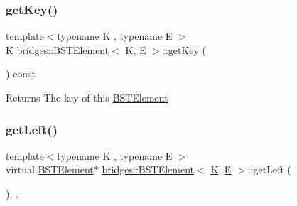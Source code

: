 \subsubsection{\texorpdfstring{getKey()}{getKey()}}
{\footnotesize\ttfamily template$<$typename K , typename E $>$ \\
\mbox{\hyperlink{namespacebridges_acfb0a4f7877d8f63de3e6862004c50edaa5f3c6a11b03839d46af9fb43c97c188}{K}} \mbox{\hyperlink{classbridges_1_1_b_s_t_element}{bridges\+::\+B\+S\+T\+Element}}$<$ \mbox{\hyperlink{namespacebridges_acfb0a4f7877d8f63de3e6862004c50edaa5f3c6a11b03839d46af9fb43c97c188}{K}}, \mbox{\hyperlink{namespacebridges_acfb0a4f7877d8f63de3e6862004c50eda3a3ea00cfc35332cedf6e5e9a32e94da}{E}} $>$\+::get\+Key (\begin{DoxyParamCaption}{ }\end{DoxyParamCaption}) const\hspace{0.3cm}{\ttfamily [inline]}}

\begin{DoxyReturn}{Returns}
The key of this \mbox{\hyperlink{classbridges_1_1_b_s_t_element}{B\+S\+T\+Element}} 
\end{DoxyReturn}
\mbox{\label{classbridges_1_1_b_s_t_element_a4d8987373c75b51fca94e3c0b78b87a6}} 
\subsubsection{\texorpdfstring{getLeft()}{getLeft()}\hspace{0.1cm}{\footnotesize\ttfamily [1/2]}}
{\footnotesize\ttfamily template$<$typename K , typename E $>$ \\
virtual \mbox{\hyperlink{classbridges_1_1_b_s_t_element}{B\+S\+T\+Element}}$\ast$ \mbox{\hyperlink{classbridges_1_1_b_s_t_element}{bridges\+::\+B\+S\+T\+Element}}$<$ \mbox{\hyperlink{namespacebridges_acfb0a4f7877d8f63de3e6862004c50edaa5f3c6a11b03839d46af9fb43c97c188}{K}}, \mbox{\hyperlink{namespacebridges_acfb0a4f7877d8f63de3e6862004c50eda3a3ea00cfc35332cedf6e5e9a32e94da}{E}} $>$\+::get\+Left (\begin{DoxyParamCaption}{ }\end{DoxyParamCaption})\hspace{0.3cm}{\ttfamily [inline]}, {\ttfamily [override]}, {\ttfamily [virtual]}}

